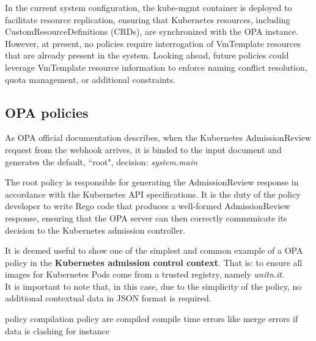 In the current system configuration, the kube-mgmt container is deployed to facilitate resource replication, ensuring that Kubernetes resources, including CustomResourceDefinitions (CRDs), are synchronized with the OPA instance. However, at present, no policies require interrogation of VmTemplate resources that are already present in the system.
Looking ahead, future policies could leverage VmTemplate resource information to enforce naming conflict resolution, quota management, or additional constraints.



\newpage




\subsection{OPA policies}
\label{sec:opa_policies}






As OPA official documentation describes, when the Kubernetes AdmissionReview request from the webhook arrives, it is binded to the input document and generates the default, ``root", decision: \textit{system.main}

The root policy is responsible for generating the AdmissionReview response in accordance with the Kubernetes API specifications. It is the duty of the policy developer to write Rego code that produces a well-formed AdmissionReview response, ensuring that the OPA server can then correctly communicate its decision to the Kubernetes admission controller.



It is deemed useful to show one of the simplest and common example of a OPA policy in the \textbf{Kubernetes admission control context}. That is: to ensure all images for Kubernetes Pods come from a trusted registry, namely \textit{unitn.it}. \\


It is important to note that, in this case, due to the simplicity of the policy, no additional contextual data in JSON format is required.


policy compilation
policy are compiled
compile time errors like merge errors if data is clashing for instance

